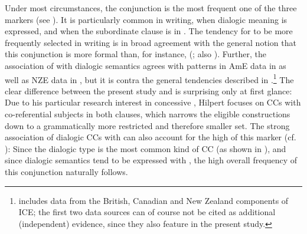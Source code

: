 Under most circumstances, the conjunction  is the most frequent one of the three markers (see ). It is particularly common in writing, when dialogic meaning is expressed, and when the subordinate clause is in . The tendency for  to be more frequently selected in writing is in broad agreement with the general notion that this conjunction is more formal than, for instance,  (\citealt{QuirkEtAl1985,BiberEtAl1999,HuddlestonPullum2002}; also \citealt{Aarts1988}). Further, the association of  with dialogic semantics agrees with patterns in AmE data in \citet{Schützler2018b} as well as NZE data in \citet{Schützler2017}, but it is contra the general tendencies described in \citet{Hilpert2013a}.{\footnote{\citet{Schützler2017} includes data from the British, Canadian and New Zealand components of ICE; the first two data sources can of course not be cited as additional (independent) evidence, since they also feature in the present study.}}  The clear difference between the present study and \citet{Hilpert2013a} is surprising only at first glance: Due to his particular research interest in concessive , Hilpert focuses on CCs with co-referential subjects in both clauses, which narrows the eligible constructions down to a grammatically more restricted and therefore smaller set. The strong association of dialogic CCs with  can also account for the high  of this marker (cf. ): Since the dialogic type is the most common kind of CC (as shown in ), and since dialogic semantics tend to be expressed with , the high overall frequency of this conjunction naturally follows.

